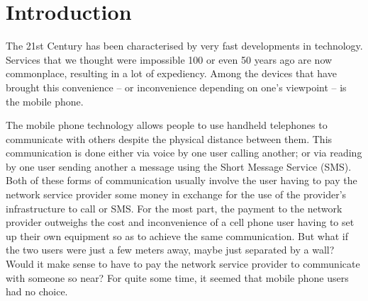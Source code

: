 \documentclass[12pt,svgnames,smaller]{article} %
\begin{document}
\clearpage




\section{\textbf{Introduction } }

The 21st Century has been characterised by very fast developments in technology. Services that we thought were impossible 100 or even 50 years ago are now commonplace, resulting in a lot of expediency. Among the devices that have brought this convenience – or inconvenience depending on one’s viewpoint – is the mobile phone.

The mobile phone technology allows people to use handheld telephones to communicate with others despite the physical distance between them. This communication is done either via voice by one user calling another; or via reading by one user sending another a message using the Short Message Service (SMS). Both of these forms of communication usually involve the user having to pay the network service provider some money in exchange for the use of the provider’s infrastructure to call or SMS.  For the most part, the payment to the network provider outweighs the cost and inconvenience of a cell phone user having to set up their own equipment so as to achieve the same communication. But what if the two users were just a few meters away, maybe just separated by a wall? Would it make sense to have to pay the network service provider to communicate with someone so near? For quite some time, it seemed that mobile phone users had no choice.
\end{document}
